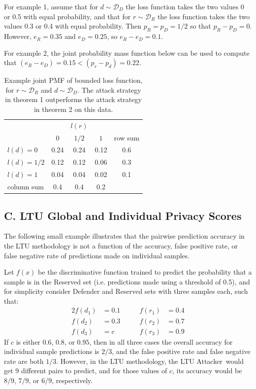 \documentclass[letterpaper]{article}
\newcommand{\oracle}{LTU Attacker~}
\begin{document}
For example 1, assume that for $d \sim \mathcal{D}_D$ the loss function takes the two values 0 or 0.5 with equal probability, and that for $r \sim \mathcal{D}_R$ the loss function takes the two values 0.3 or 0.4 with equal probability. Then $p_R = p_D = 1/2$ so that $p_R - p_D = 0$. However, $e^{}_R = 0.35$ and $e^{}_D = 0.25$, so $e^{}_R - e^{}_D = 0.1$.

For example 2, the joint probability mass function below can be used to compute that $( e^{}_R - e^{}_D ) = 0.15 < (p_r-p_d) = 0.22$.
\begin{table}[H]
\caption{Example joint PMF of bounded loss function, for $r \sim \mathcal{D}_R$ and $d \sim \mathcal{D}_D$. The attack strategy in theorem 1 outperforms the attack strategy in theorem 2 on this data.} 
\begin{tabular}{lcccc}
\multicolumn{1}{c}{}&
\multicolumn{1}{c}{} &
\multicolumn{1}{c}{$l(r)$} &
\multicolumn{1}{c}{} &
\multicolumn{1}{c}{} \\
\multicolumn{1}{c}{}&
\multicolumn{1}{c}{$0$} &
\multicolumn{1}{c}{$1/2$} &
\multicolumn{1}{c}{$1$} &
\multicolumn{1}{c}{row sum} \\
\cline{2-4}
    $l(d)=0$ & 0.24 & 0.24 & 0.12 & 0.6\\
\cline{2-4}
    $l(d)=1/2$ & 0.12 & 0.12 & 0.06 & 0.3\\
\cline{2-4}
    $l(d)=1$ & 0.04 & 0.04 & 0.02 & 0.1\\
\cline{2-4}
    column sum & 0.4 & 0.4 & 0.2 & \\
\end{tabular}
\end{table}

\subsection{C. LTU Global and Individual Privacy Scores}

The following small example illustrates that the pairwise prediction accuracy in the LTU methodology is not a function of the accuracy, false positive rate, or false negative rate of predictions made on individual samples.

Let $f(x)$ be the discriminative function trained to predict the probability that a sample is in the Reserved set (i.e. predictions made using a threshold of 0.5), and for simplicity consider Defender and Reserved sets with three samples each, such that:
\begin{alignat*}{2}
f(d_1) &=0.1 \qquad & f(r_1) &=0.4\\
f(d_2) &=0.3 & f(r_2) &=0.7\\
f(d_3) &=c   & f(r_3) &=0.9
\end{alignat*}
If $c$ is either $0.6$, $0.8$, or $0.95$, then in all three cases the overall accuracy for individual sample predictions is $2/3$, and the false positive rate and false negative rate are both $1/3$. However, in the LTU methodology, the \oracle would get 9 different pairs to predict, and for those values of $c$, its accuracy would be $8/9$, $7/9$, or $6/9$, respectively.
\end{document}

